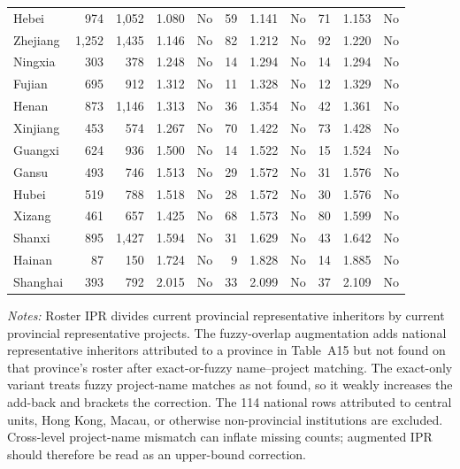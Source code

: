 \begin{table}[!htbp]
{\begin{tabular}{lrrrrrrrrrr}
Hebei & 974 & 1,052 & 1.080 & No & 59 & 1.141 & No & 71 & 1.153 & No \\
Zhejiang & 1,252 & 1,435 & 1.146 & No & 82 & 1.212 & No & 92 & 1.220 & No \\
Ningxia & 303 & 378 & 1.248 & No & 14 & 1.294 & No & 14 & 1.294 & No \\
Fujian & 695 & 912 & 1.312 & No & 11 & 1.328 & No & 12 & 1.329 & No \\
Henan & 873 & 1,146 & 1.313 & No & 36 & 1.354 & No & 42 & 1.361 & No \\
Xinjiang & 453 & 574 & 1.267 & No & 70 & 1.422 & No & 73 & 1.428 & No \\
Guangxi & 624 & 936 & 1.500 & No & 14 & 1.522 & No & 15 & 1.524 & No \\
Gansu & 493 & 746 & 1.513 & No & 29 & 1.572 & No & 31 & 1.576 & No \\
Hubei & 519 & 788 & 1.518 & No & 28 & 1.572 & No & 30 & 1.576 & No \\
Xizang & 461 & 657 & 1.425 & No & 68 & 1.573 & No & 80 & 1.599 & No \\
Shanxi & 895 & 1,427 & 1.594 & No & 31 & 1.629 & No & 43 & 1.642 & No \\
Hainan & 87 & 150 & 1.724 & No & 9 & 1.828 & No & 14 & 1.885 & No \\
Shanghai & 393 & 792 & 2.015 & No & 33 & 2.099 & No & 37 & 2.109 & No \\
\bottomrule
\end{tabular}
}
\begin{minipage}{0.96\textwidth}
\footnotesize \textit{Notes:} Roster IPR divides current provincial representative inheritors by current provincial representative projects. The fuzzy-overlap augmentation adds national representative inheritors attributed to a province in Table~A15 but not found on that province's roster after exact-or-fuzzy name--project matching. The exact-only variant treats fuzzy project-name matches as not found, so it weakly increases the add-back and brackets the correction. The 114 national rows attributed to central units, Hong Kong, Macau, or otherwise non-provincial institutions are excluded. Cross-level project-name mismatch can inflate missing counts; augmented IPR should therefore be read as an upper-bound correction.
\end{minipage}
\end{table}
